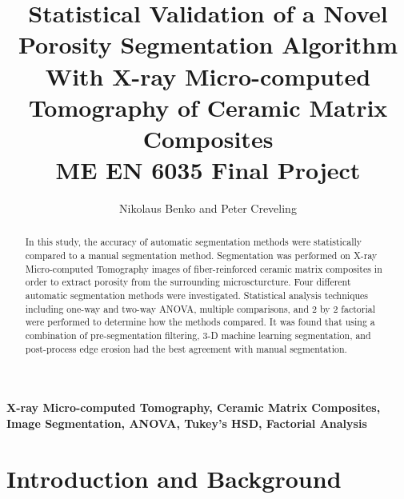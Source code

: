 \documentclass[11pt, twocolumn]{IEEEtran}
\begin{document}
\title{ Statistical Validation of a Novel Porosity Segmentation Algorithm With X-ray Micro-computed Tomography of Ceramic Matrix Composites  \\ \bigskip \normalsize{ME EN 6035 Final Project}}
\author{Nikolaus Benko and Peter Creveling}
\maketitle


\begin{abstract} 
In this study, the accuracy of automatic segmentation methods were statistically compared to a manual segmentation method. Segmentation was performed on X-ray Micro-computed Tomography images of fiber-reinforced ceramic matrix composites in order to extract porosity from the surrounding microscturcture. Four different automatic segmentation methods were investigated. Statistical analysis techniques including one-way and two-way ANOVA, multiple comparisons, and 2 by 2 factorial were performed to determine how the methods compared. It was found that using a combination of pre-segmentation filtering, 3-D machine learning segmentation, and post-process edge erosion had the best agreement with manual segmentation.
\end{abstract}

\textbf{X-ray Micro-computed Tomography, Ceramic Matrix Composites, Image Segmentation, ANOVA, Tukey's HSD, Factorial Analysis}

\section{Introduction and Background}
\end{document}
